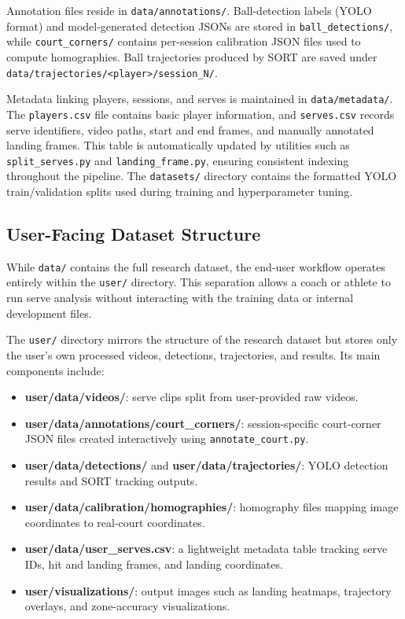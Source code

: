 Annotation files reside in \texttt{data/annotations/}. Ball-detection labels (YOLO format) and model-generated detection JSONs are stored in \texttt{ball\_detections/}, while \texttt{court\_corners/} contains per-session calibration JSON files used to compute homographies. Ball trajectories produced by SORT are saved under \texttt{data/trajectories/<player>/session\_N/}.

Metadata linking players, sessions, and serves is maintained in \texttt{data/metadata/}. The \texttt{players.csv} file contains basic player information, and \texttt{serves.csv} records serve identifiers, video paths, start and end frames, and manually annotated landing frames. This table is automatically updated by utilities such as \texttt{split\_serves.py} and \texttt{landing\_frame.py}, ensuring consistent indexing throughout the pipeline. The \texttt{datasets/} directory contains the formatted YOLO train/validation splits used during training and hyperparameter tuning.

\subsection{User-Facing Dataset Structure}
While \texttt{data/} contains the full research dataset, the end-user workflow operates entirely within the \texttt{user/} directory. This separation allows a coach or athlete to run serve analysis without interacting with the training data or internal development files.

The \texttt{user/} directory mirrors the structure of the research dataset but stores only the user's own processed videos, detections, trajectories, and results. Its main components include:
\begin{itemize}
    \item \textbf{user/data/videos/}: serve clips split from user-provided raw videos.
    \item \textbf{user/data/annotations/court\_corners/}: session-specific court-corner JSON files created interactively using \texttt{annotate\_court.py}.
    \item \textbf{user/data/detections/} and \textbf{user/data/trajectories/}: YOLO detection results and SORT tracking outputs.
    \item \textbf{user/data/calibration/homographies/}: homography files mapping image coordinates to real-court coordinates.
    \item \textbf{user/data/user\_serves.csv}: a lightweight metadata table tracking serve IDs, hit and landing frames, and landing coordinates.
    \item \textbf{user/visualizations/}: output images such as landing heatmaps, trajectory overlays, and zone-accuracy visualizations.
\end{itemize}

